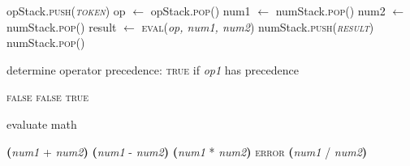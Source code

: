 \documentclass{article}
\begin{document}
\begin{algorithm}
\begin{algorithmic}[1]
                                        \State opStack.\textsc{push(\textit{token})}
                                \EndIf
                        \EndWhile
                                \State op $ \gets $ opStack.\textsc{pop}()
                                \State num1 $ \gets $ numStack.\textsc{pop}()
                                \State num2 $ \gets $ numStack.\textsc{pop}()
                                \State result $ \gets $ \textsc{eval}(\textit{op, num1, num2})
                                \State numStack.\textsc{push(\textit{result})}
                        \EndWhile
                        \State \Return numStack.\textsc{pop()}
                        \EndFunction
                \end{algorithmic}
        \end{algorithm}
    
    \begin{algorithm}
    	\caption{determine operator precedence: \textsc{true} if \textit{op1} has precedence}
    	\label{opPrec}
    	\begin{algorithmic}[1]
    				\State \Return \textsc{false}
    				\State \Return \textsc{false}
    			\Else 
    				\State \Return \textsc{true}
    			\EndIf
    		\EndFunction
    	\end{algorithmic}
    \end{algorithm}
    
    \begin{algorithm}
    	\caption{evaluate math}
    	\label{eval}
    	\begin{algorithmic}[1]
    				\State \Return \textbf{(}\textit{num1} + \textit{num2}\textbf{)}
    				\State \Return \textbf{(}\textit{num1} - \textit{num2}\textbf{)}
    				\State \Return \textbf{(}\textit{num1} * \textit{num2}\textbf{)}
    					\State \Return \textsc{error}
    				\Else
    					\State \Return \textbf{(}\textit{num1} / \textit{num2}\textbf{)}
    				\EndIf
    			\EndIf
    		\EndFunction
    	\end{algorithmic}
    \end{algorithm}
\end{document}
